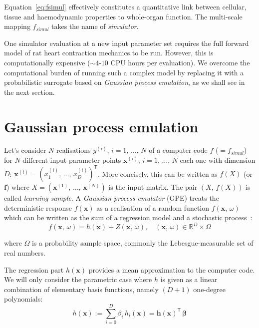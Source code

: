 \noindent
Equation~\eqref{eq:fsimul} effectively constitutes a quantitative link between cellular, tissue and haemodynamic properties to whole-organ function. The multi-scale mapping $f_{simul}$ takes the name of \textit{simulator}.

\vspace{0.2cm}
One simulator evaluation at a new input parameter set requires the full forward model of rat heart contraction mechanics to be run. However, this is computationally expensive ($\sim 4$-$10$ CPU hours per evaluation). We overcome the computational burden of running such a complex model by replacing it with a probabilistic surrogate based on \textit{Gaussian process emulation}, as we shall see in the next section.


%
%
%
\section{Gaussian process emulation}\label{sec:ch3gaussianprocessemulation}
Let's consider $N$ realisations $y^{(i)},\,i=1,\,\dots,\,N$ of a computer code $f$ ($=f_{simul}$) for $N$ different input parameter points $\mathbf{x}^{(i)},\,i=1,\,\dots,\,N$ each one with dimension $D$: $\mathbf{x}^{(i)}=(x_{1}^{(i)},\,\dots,\,x_{D}^{(i)})^\mathsf{T}$. More concisely, this can be written as $f(X)$ (or $\mathbf{f}$) where $X=(\mathbf{x}^{(1)},\,\dots,\,\mathbf{x}^{(N)})$ is the input matrix. The pair $(X,\,f(X))$ is called \textit{learning sample}. A \textit{Gaussian process emulator} (\acs{GPE}) treats the deterministic response $f(\mathbf{x})$ as a realisation of a random function $f(\mathbf{x},\,\omega)$ which can be written as the sum of a regression model and a stochastic process~\cite{OHagan:2006}:
\begin{equation}
    f(\mathbf{x},\,\omega) = h(\mathbf{x}) + Z(\mathbf{x},\,\omega), \quad (\mathbf{x},\,\omega)\in\mathbb{R}^D\times\Omega
\end{equation}

\noindent
where $\Omega$ is a probability sample space, commonly the Lebesgue-measurable set of real numbers.

\vspace{0.2cm}
The regression part $h(\mathbf{x})$ provides a mean approximation to the computer code. We will only consider the parametric case where $h$ is given as a linear combination of elementary basis functions, namely $(D+1)$ one-degree polynomials:
%
\begin{equation}
    h(\mathbf{x}):=\sum_{i=0}^D\beta_i\,h_i(\mathbf{x}) = \mathbf{h}(\mathbf{x})^\mathsf{T}\,\boldsymbol{\beta}
\end{equation}

